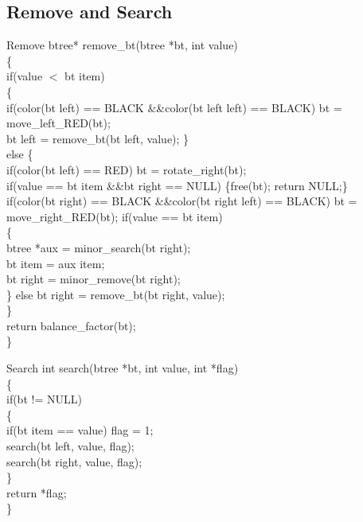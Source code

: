 \documentclass{beamer}
\begin{document}
\subsection{Remove and Search}
\begin{frame}{Remove}
\scriptsize{btree* remove\_bt(btree *bt, int value)\\
\{\\
        if(value $<$ bt \rightarrow item)\\
        \{\\
            if(color(bt \rightarrow left) == BLACK \quad\&\&\quad color(bt \rightarrow left \rightarrow left) == BLACK) \quad bt = move\_left\_RED(bt);\\
            bt \rightarrow left = remove\_bt(bt \rightarrow left, value);
        \}\\
        else
        \{\\
            if(color(bt \rightarrow left) == RED) \quad bt = rotate\_right(bt);\\
            if(value == bt \rightarrow item \quad\&\&\quad bt \rightarrow right == NULL) \quad \{free(bt); return NULL;\}\\
            if(color(bt \rightarrow right) == BLACK \quad\&\&\quad color(bt \rightarrow right \rightarrow left) == BLACK) \quad bt = move\_right\_RED(bt);
            if(value == bt \rightarrow item)\\
            \{\\
                btree *aux = minor\_search(bt \rightarrow right);\\
                bt \rightarrow item = aux \rightarrow item;\\
                bt \rightarrow right = minor\_remove(bt \rightarrow right);\\
            \} \quad else bt \rightarrow right = remove\_bt(bt \rightarrow right, value);\\
        \}\\
        return balance\_factor(bt);\\
\}}
\end{frame}

\begin{frame}{Search}
int search(btree *bt, int value, int *flag)\\
\{\\
    if(bt != NULL)\\
    \{\\
        if(bt \rightarrow item == value) \quad *flag = 1;\\
        search(bt \rightarrow left, value, flag);\\
        search(bt \rightarrow right, value, flag);\\
    \}\\
    return *flag;\\
\}    
\end{frame}
\end{document}
